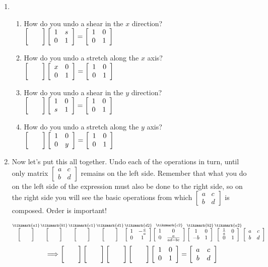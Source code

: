 \documentclass[../gatm.tex]{subfiles}
\begin{document}
\begin{enumerate}
\item \begin{enumerate}
\item How do you undo a shear in the $x$ direction?
$\left[\begin{array}{cc}  &  \\  &  \end{array}\right]\left[\begin{array}{cc} 1 & s \\ 0 & 1 \end{array}\right]=\left[\begin{array}{cc} 1 & 0 \\ 0 & 1 \end{array}\right]$
\item How do you undo a stretch along the $x$ axis?
$\left[\begin{array}{cc}  &  \\  &  \end{array}\right]\left[\begin{array}{cc} x & 0 \\ 0 & 1 \end{array}\right]=\left[\begin{array}{cc} 1 & 0 \\ 0 & 1 \end{array}\right]$
\item How do you undo a shear in the $y$ direction?
$\left[\begin{array}{cc}  &  \\  &  \end{array}\right]\left[\begin{array}{cc} 1 & 0 \\ s & 1 \end{array}\right]=\left[\begin{array}{cc} 1 & 0 \\ 0 & 1 \end{array}\right]$
\item How do you undo a stretch along the $y$ axis?
$\left[\begin{array}{cc}  &  \\  &  \end{array}\right]\left[\begin{array}{cc} 1 & 0 \\ 0 & y \end{array}\right]=\left[\begin{array}{cc} 1 & 0 \\ 0 & 1 \end{array}\right]$
\end{enumerate}

\item Now let's put this all together. Undo each of the operations in turn, until only matrix $\left[\begin{smallmatrix}a & c \\ b & d \end{smallmatrix}\right]$ remains on the left side. Remember that what you do on the left side of the expression must also be done to the right side, so on the right side you will see the basic operations from which $\left[\begin{smallmatrix}a & c \\ b & d \end{smallmatrix}\right]$ is composed. Order is important!

\vspace{1.5cm}
$$\mathop{\twomat{}{}{}{}}^{\tikzmark{a1}}
\mathop{\twomat{}{}{}{}}^{\tikzmark{b1}}
\mathop{\twomat{}{}{}{}}^{\tikzmark{c1}}
\mathop{\twomat{}{}{}{}}^{\tikzmark{d1}}
\mathop{\twomat{1}{-\frac{c}{a}}{0}{1}}^{\tikzmark{d2}}
\mathop{\twomat{1}{0}{0}{\frac{a}{ad-bc}}}^{\tikzmark{c2}}
\mathop{\twomat{1}{0}{-b}{1}}^{\tikzmark{b2}}
\mathop{\twomat{\frac{1}{a}}{0}{0}{1}}^{\tikzmark{a2}}
\twomat{a}{c}{b}{d}$$
$$\Longrightarrow \left[\begin{array}{cc}  &  \\  &  \end{array}\right]\left[\begin{array}{cc}  &  \\  &  \end{array}\right]\left[\begin{array}{cc}  &  \\  &  \end{array}\right]\left[\begin{array}{cc}  &  \\  &  \end{array}\right]\left[\begin{array}{cc} 1 & 0 \\ 0 & 1 \end{array}\right] = \left[\begin{array}{cc} a & c \\ b & d \end{array}\right]$$


\end{enumerate}
\end{document}
